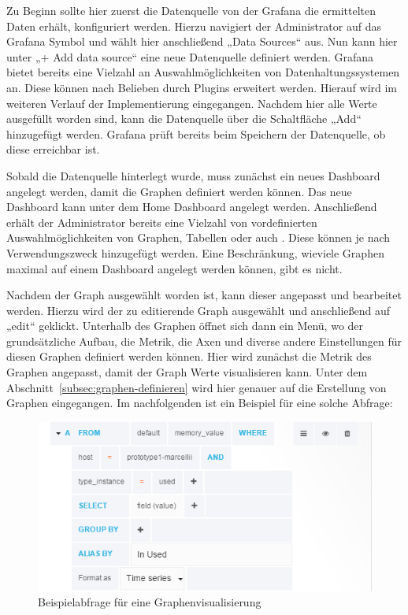 Zu Beginn sollte hier zuerst die Datenquelle von der Grafana die ermittelten
Daten erhält, konfiguriert werden. Hierzu navigiert der Administrator auf das
Grafana Symbol und wählt hier anschließend „Data Sources“ aus. Nun kann hier
unter „+ Add data source“ eine neue Datenquelle definiert werden. Grafana
bietet bereits eine Vielzahl an Auswahlmöglichkeiten von Datenhaltungssystemen
an. Diese können nach Belieben durch Plugins erweitert werden. Hierauf wird im
weiteren Verlauf der Implementierung eingegangen. Nachdem hier alle Werte
ausgefüllt worden sind, kann die Datenquelle über die Schaltfläche „Add“
hinzugefügt werden. Grafana prüft bereits beim Speichern der Datenquelle, ob
diese erreichbar ist.

Sobald die Datenquelle hinterlegt wurde, muss zunächst ein neues Dashboard
angelegt werden, damit die Graphen definiert werden können. Das neue Dashboard
kann unter dem Home Dashboard angelegt werden. Anschließend erhält der
Administrator bereits eine Vielzahl von vordefinierten Auswahlmöglichkeiten von
Graphen, Tabellen oder auch . Diese können je
nach Verwendungszweck hinzugefügt werden. Eine Beschränkung, wieviele Graphen
maximal auf einem Dashboard angelegt werden können, gibt es nicht.

Nachdem der Graph ausgewählt worden ist, kann dieser angepasst und bearbeitet
werden. Hierzu wird der zu editierende Graph ausgewählt und anschließend auf
„edit“ geklickt. Unterhalb des Graphen öffnet sich dann ein Menü, wo der
grundsätzliche Aufbau, die Metrik, die Axen und diverse andere Einstellungen
für diesen Graphen definiert werden können. Hier wird zunächst die Metrik des
Graphen angepasst, damit der Graph Werte visualisieren kann. Unter dem
Abschnitt~\ref{subsec:graphen-definieren} wird hier genauer auf die Erstellung
von Graphen eingegangen. Im nachfolgenden ist ein Beispiel für eine solche
Abfrage:

\begin{figure}[H]
  \centering
  \includegraphics[width=1.0\textwidth]{../figures/graph.png}
  \caption{Beispielabfrage für eine Graphenvisualisierung}
\label{figure:graph}
\end{figure}

